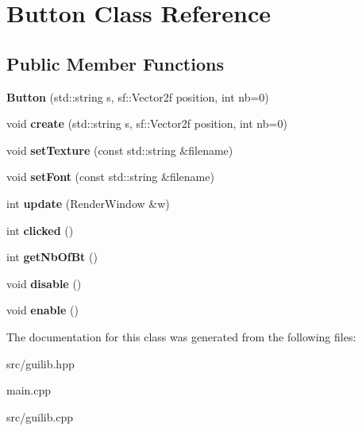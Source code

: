 \hypertarget{class_button}{}\section{Button Class Reference}
\label{class_button}
\subsection*{Public Member Functions}
\begin{DoxyCompactItemize}
\item 
{\bfseries Button} (std\+::string s, sf\+::\+Vector2f position, int nb=0)\hypertarget{class_button_a941cf3f1f95654c5b19b47e56e6cc635}{}\label{class_button_a941cf3f1f95654c5b19b47e56e6cc635}

\item 
void {\bfseries create} (std\+::string s, sf\+::\+Vector2f position, int nb=0)\hypertarget{class_button_afa0ead4b7c469f56757562fcff6e7a3c}{}\label{class_button_afa0ead4b7c469f56757562fcff6e7a3c}

\item 
void {\bfseries set\+Texture} (const std\+::string \&filename)\hypertarget{class_button_a10e78ae5d324ba437180714155928a11}{}\label{class_button_a10e78ae5d324ba437180714155928a11}

\item 
void {\bfseries set\+Font} (const std\+::string \&filename)\hypertarget{class_button_aa74e79c2f66153d3635cfeb05a4882fe}{}\label{class_button_aa74e79c2f66153d3635cfeb05a4882fe}

\item 
int {\bfseries update} (Render\+Window \&w)\hypertarget{class_button_a15b5d672bee69cab7c02d7dbb3efc5db}{}\label{class_button_a15b5d672bee69cab7c02d7dbb3efc5db}

\item 
int {\bfseries clicked} ()\hypertarget{class_button_a39ef46d1d6ba89e67b47767cf774714c}{}\label{class_button_a39ef46d1d6ba89e67b47767cf774714c}

\item 
int {\bfseries get\+Nb\+Of\+Bt} ()\hypertarget{class_button_ae80715b5f7c59eeb3677008053937732}{}\label{class_button_ae80715b5f7c59eeb3677008053937732}

\item 
void {\bfseries disable} ()\hypertarget{class_button_abde3c72299314347169ef607ec7b7192}{}\label{class_button_abde3c72299314347169ef607ec7b7192}

\item 
void {\bfseries enable} ()\hypertarget{class_button_a2829d6ad3d25929c6755a6f17cee7cb3}{}\label{class_button_a2829d6ad3d25929c6755a6f17cee7cb3}

\end{DoxyCompactItemize}


The documentation for this class was generated from the following files\+:\begin{DoxyCompactItemize}
\item 
src/guilib.\+hpp\item 
main.\+cpp\item 
src/guilib.\+cpp\end{DoxyCompactItemize}
